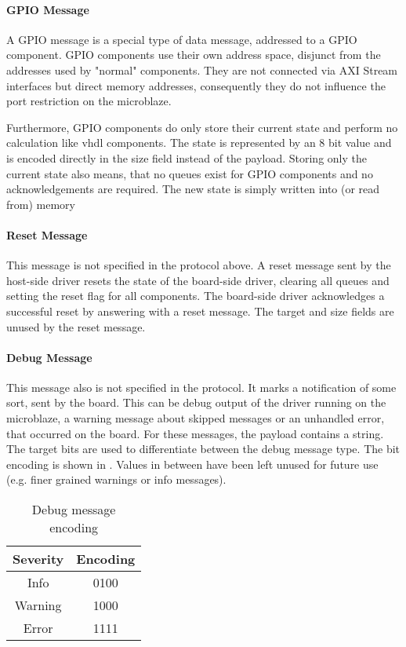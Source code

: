 \documentclass{report}
\begin{document}
\paragraph{GPIO Message}
A GPIO message is a special type of data message, addressed to a GPIO component. GPIO components use their own address space, disjunct from the addresses used by "normal" components. They are not connected via AXI Stream interfaces but direct memory addresses, consequently they do not influence the port restriction on the microblaze.

Furthermore, GPIO components do only store their current state and perform no calculation like vhdl components. The state is represented by an 8 bit value and is encoded directly in the size field instead of the payload. Storing only the current state also means, that no queues exist for GPIO components and no acknowledgements are required. The new state is simply written into (or read from) memory

\paragraph{Reset Message}
This message is not specified in the protocol above. A reset message sent by the host-side driver resets the state of the board-side driver, clearing all queues and setting the reset flag for all components. The board-side driver acknowledges a successful reset by answering with a reset message. 
The target and size fields are unused by the reset message.

\paragraph{Debug Message}
This message also is not specified in the protocol. It marks a notification of some sort, sent by the board. This can be debug output of the driver running on the microblaze, a warning message about skipped messages or an unhandled error, that occurred on the board. For these messages, the payload contains a string.
The target bits are used to differentiate between the debug message type. The bit encoding is shown in . Values in between have been left unused for future use (e.g. finer grained warnings or info messages).

\begin{table}[h]
\centering
\begin{tabular}{ c | c } 
Severity & Encoding \\ \hline
Info & 0100 \\
Warning & 1000 \\
Error &  1111 \\
 \end{tabular}
\caption{Debug message encoding}
\label{tab:protoDebug}
\end{table}
\end{document}
